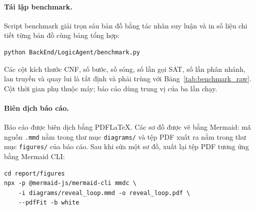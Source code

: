 \paragraph{Tái lập benchmark.}
Script benchmark giải trọn sáu bản đồ bằng tác nhân suy luận và in số liệu chi
tiết từng bản đồ cùng bảng tổng hợp:
\begin{verbatim}
python BackEnd/LogicAgent/benchmark.py
\end{verbatim}
Các cột kích thước CNF, số bước, số sóng, số lần gọi SAT, số lần phân nhánh,
lan truyền và quay lui là tất định và phải trùng với
Bảng~\ref{tab:benchmark_raw}. Cột thời gian phụ thuộc máy; báo cáo dùng trung vị của
ba lần chạy.

\paragraph{Biên dịch báo cáo.}
Báo cáo được biên dịch bằng PDFLaTeX. Các sơ đồ được vẽ bằng Mermaid: mã
nguồn \texttt{.mmd} nằm trong thư mục \nolinkurl{diagrams/} và tệp PDF xuất ra nằm
trong thư mục \nolinkurl{figures/} của báo cáo. Sau khi sửa một sơ đồ, xuất lại tệp PDF
tương ứng bằng Mermaid CLI:
\begin{verbatim}
cd report/figures
npx -p @mermaid-js/mermaid-cli mmdc \
    -i diagrams/reveal_loop.mmd -o reveal_loop.pdf \
    --pdfFit -b white
\end{verbatim}

